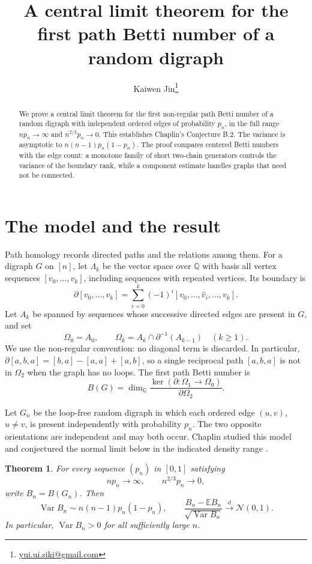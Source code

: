 \documentclass[11pt]{article}
\title{A central limit theorem for the first path Betti number of a random digraph}
\author{Kaiwen Jin\thanks{\href{mailto:yui.ui.siki@gmail.com}{yui.ui.siki@gmail.com}}}
\date{}
\newtheorem{theorem}{Theorem}
\newcommand{\E}{\mathbb E}
\newcommand{\Var}{\operatorname{Var}}
\newcommand{\Q}{\mathbb Q}
\begin{document}
\maketitle

\begin{abstract}
We prove a central limit theorem for the first non-regular path Betti number of a random digraph with independent ordered edges of probability $p_n$, in the full range $np_n\to\infty$ and $n^{2/3}p_n\to0$. This establishes Chaplin's Conjecture B.2. The variance is asymptotic to $n(n-1)p_n(1-p_n)$. The proof compares centered Betti numbers with the edge count: a monotone family of short two-chain generators controls the variance of the boundary rank, while a component estimate handles graphs that need not be connected.
\end{abstract}

\section{The model and the result}

Path homology records directed paths and the relations among them. For a digraph $G$ on $[n]$, let $\Lambda_k$ be the vector space over $\Q$ with basis all vertex sequences $[v_0,\ldots,v_k]$, including sequences with repeated vertices. Its boundary is
\[
 \partial[v_0,\ldots,v_k]
 =\sum_{i=0}^k(-1)^i[v_0,\ldots,\widehat v_i,\ldots,v_k].
\]
Let $A_k$ be spanned by sequences whose successive directed edges are present in $G$, and set
\[
 \Omega_0=A_0,\qquad
 \Omega_k=A_k\cap\partial^{-1}(A_{k-1})\quad(k\ge1).
\]
We use the non-regular convention: no diagonal term is discarded. In particular,
$\partial[a,b,a]=[b,a]-[a,a]+[a,b]$, so a single reciprocal path $[a,b,a]$ is not in $\Omega_2$ when the graph has no loops. The first path Betti number is
\[
 B(G)=\dim_{\Q}\frac{\ker(\partial:\Omega_1\to\Omega_0)}{\partial\Omega_2}.
\]

Let $G_n$ be the loop-free random digraph in which each ordered edge $(u,v)$, $u\ne v$, is present independently with probability $p_n$. The two opposite orientations are independent and may both occur. Chaplin studied this model and conjectured the normal limit below in the indicated density range \cite[Conjecture B.2]{chaplin}.

\begin{theorem}\label{thm:main}
For every sequence $(p_n)$ in $[0,1]$ satisfying
\begin{equation}\label{eq:window}
 np_n\longrightarrow\infty,\qquad n^{2/3}p_n\longrightarrow0,
\end{equation}
write $B_n=B(G_n)$. Then
\begin{equation}\label{eq:result}
 \Var B_n\sim n(n-1)p_n(1-p_n),\qquad
 \frac{B_n-\E B_n}{\sqrt{\Var B_n}}
 \xrightarrow{\ d\ }\mathcal N(0,1).
\end{equation}
In particular, $\Var B_n>0$ for all sufficiently large $n$.
\end{theorem}
\end{document}
